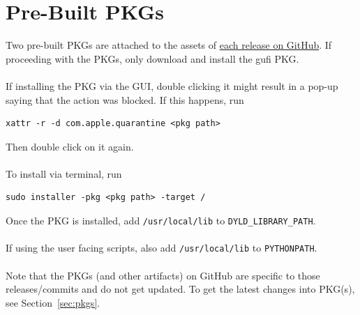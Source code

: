 \section{Pre-Built PKGs}
Two pre-built PKGs are attached to the assets of
\href{https://github.com/mar-file-system/GUFI/releases}{each release
 on GitHub}. If proceeding with the PKGs, only download and install
the gufi PKG.
\\\\
If installing the PKG via the GUI, double clicking it might result in
a pop-up saying that the action was blocked. If this happens, run
\begin{verbatim}
xattr -r -d com.apple.quarantine <pkg path>
\end{verbatim}
Then double click on it again.
\\\\
To install via terminal, run
\begin{verbatim}
sudo installer -pkg <pkg path> -target /
\end{verbatim}
Once the PKG is installed, add \texttt{/usr/local/lib} to
\texttt{DYLD\_LIBRARY\_PATH}.
\\\\
If using the user facing scripts, also add \texttt{/usr/local/lib} to
\texttt{PYTHONPATH}.
\\\\
Note that the PKGs (and other artifacts) on GitHub are specific to
those releases/commits and do not get updated. To get the latest
changes into PKG(s), see Section~\ref{sec:pkgs}.
